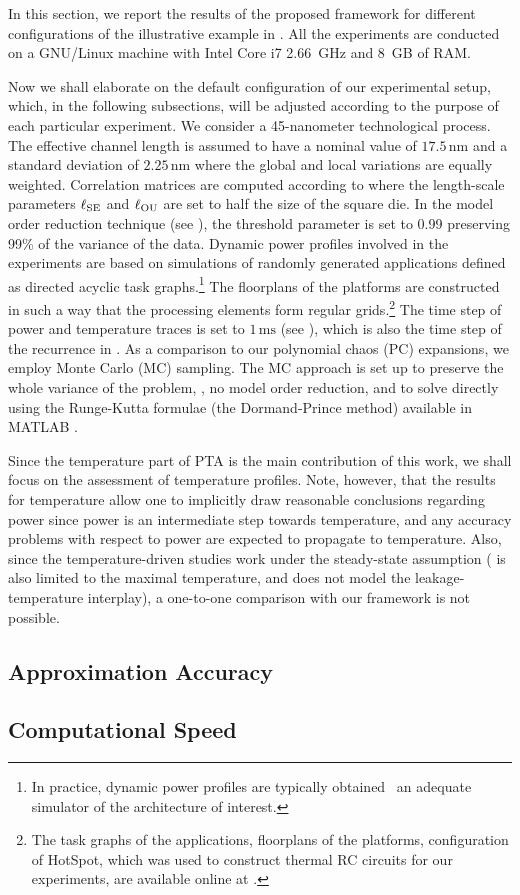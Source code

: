 
In this section, we report the results of the proposed framework for different configurations of the illustrative example in .
All the experiments are conducted on a GNU/Linux machine with Intel Core i7 2.66~GHz and 8~GB of RAM.

Now we shall elaborate on the default configuration of our experimental setup, which, in the following subsections, will be adjusted according to the purpose of each particular experiment.
We consider a 45-nanometer technological process.
The effective channel length is assumed to have a nominal value of $17.5\,\text{nm}$ \cite{ptm} and a standard deviation of $2.25\,\text{nm}$ where the global and local variations are equally weighted.
Correlation matrices are computed according to  where the length-scale parameters $\ell_{\text{SE}}$ and $\ell_{\text{OU}}$ are set to half the size of the square die.
In the model order reduction technique (see ), the threshold parameter is set to 0.99 preserving 99\% of the variance of the data.
Dynamic power profiles involved in the experiments are based on simulations of randomly generated applications defined as directed acyclic task graphs.\footnote{In practice, dynamic power profiles are typically obtained \via\ an adequate simulator of the architecture of interest.}
The floorplans of the platforms are constructed in such a way that the processing elements form regular grids.\footnote{The task graphs of the applications, floorplans of the platforms, configuration of HotSpot, which was used to construct thermal RC circuits for our experiments, are available online at \cite{sources}.}
The time step of power and temperature traces is set to $1\,\text{ms}$ (see ), which is also the time step of the recurrence in .
As a comparison to our polynomial chaos (PC) expansions, we employ Monte Carlo (MC) sampling.
The MC approach is set up to preserve the whole variance of the problem, \ie, no model order reduction, and to solve  directly using the Runge-Kutta formulae (the Dormand-Prince method) available in MATLAB \cite{matlab}.

Since the temperature part of PTA is the main contribution of this work, we shall focus on the assessment of temperature profiles.
Note, however, that the results for temperature allow one to implicitly draw reasonable conclusions regarding power since power is an intermediate step towards temperature, and any accuracy problems with respect to power are expected to propagate to temperature.
Also, since the temperature-driven studies \cite{juan2011, juan2012, huang2009, lee2013} work under the steady-state assumption (\cite{juan2011} is also limited to the maximal temperature, and \cite{huang2009} does not model the leakage-temperature interplay), a one-to-one comparison with our framework is not possible.

\subsection{Approximation Accuracy} 


\subsection{Computational Speed} 

